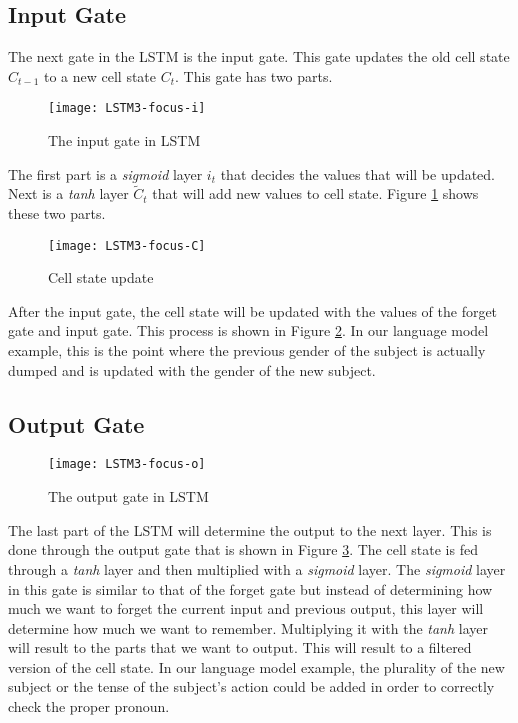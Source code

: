     \subsection{Input Gate}
        The next gate in the LSTM is the input gate. This gate updates the old cell state \( C_{t-1} \) to a new cell state \( C_t \). This gate has two parts.

        \begin{figure}[H]
        \centering
        \texttt{[image: LSTM3-focus-i]}
        \caption{The input gate in LSTM \citep{olah2015understanding}}
        \label{fig:lstm-input-gate}
        \end{figure}

        The first part is a \textit{sigmoid} layer \( i_t \) that decides the values that will be updated. Next is a \textit{tanh} layer \(\tilde{C}_t\) that will add new values to cell state. Figure \ref{fig:lstm-input-gate} shows these two parts.

        \begin{figure}[H]
        \centering
        \texttt{[image: LSTM3-focus-C]}
        \caption{Cell state update \citep{olah2015understanding}}
        \label{fig:lstm-cell-state-update}
        \end{figure}
        After the input gate, the cell state will be updated with the values of the forget gate and input gate. This process is shown in Figure \ref{fig:lstm-cell-state-update}. In our language model example, this is the point where the previous gender of the subject is actually dumped and is updated with the gender of the new subject.

    \subsection{Output Gate}
        \begin{figure}[H]
        \centering
        \texttt{[image: LSTM3-focus-o]}
        \caption{The output gate in LSTM \citep{olah2015understanding}}
        \label{fig:lstm-output-gate}
        \end{figure}
        The last part of the LSTM will determine the output to the next layer. This is done through the output gate that is shown in Figure \ref{fig:lstm-output-gate}. The cell state is fed through a \textit{tanh} layer and then multiplied with a \textit{sigmoid} layer. The \textit{sigmoid} layer in this gate is similar to that of the forget gate but instead of determining how much we want to forget the current input and previous output, this layer will determine how much we want to remember. Multiplying it with the \textit{tanh} layer will result to the parts that we want to output. This will result to a filtered version of the cell state. In our language model example, the plurality of the new subject or the tense of the subject's action could be added in order to correctly check the proper pronoun.

